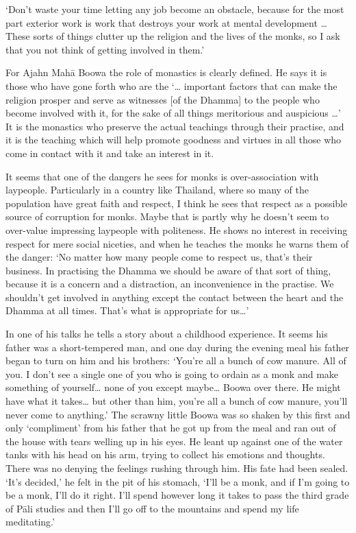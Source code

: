 `Don't waste your time letting any job become an obstacle, because for
the most part exterior work is work that destroys your work at mental
development \ldots{} These sorts of things clutter up the religion and
the lives of the monks, so I ask that you not think of getting involved
in them.'

For Ajahn Mahā Boowa the role of monastics is clearly defined. He says
it is those who have gone forth who are the `\ldots{} important factors
that can make the religion prosper and serve as witnesses [of the
Dhamma] to the people who become involved with it, for the sake of all
things meritorious and auspicious \ldots{}' It is the monastics who
preserve the actual teachings through their practise, and it is the
teaching which will help promote goodness and virtues in all those who
come in contact with it and take an interest in it. 

It seems that one of the dangers he sees for monks is over-association
with laypeople. Particularly in a country like Thailand, where so many
of the population have great faith and respect, I think he sees that
respect as a possible source of corruption for monks. Maybe that is
partly why he doesn't seem to over-value impressing laypeople with
politeness. He shows no interest in receiving respect for mere social
niceties, and when he teaches the monks he warns them of the danger: `No
matter how many people come to respect us, that's their business. In
practising the Dhamma we should be aware of that sort of thing, because
it is a concern and a distraction, an inconvenience in the practise. We
shouldn't get involved in anything except the contact between the heart
and the Dhamma at all times. That's what is appropriate for us\ldots{}'

In one of his talks he tells a story about a childhood experience. It
seems his father was a short-tempered man, and one day during the
evening meal his father began to turn on him and his brothers: `You're
all a bunch of cow manure. All of you. I don't see a single one of you
who is going to ordain as a monk and make something of yourself\ldots{}
none of you except maybe\ldots{} Boowa over there. He might have what
it takes\ldots{} but other than him, you're all a bunch of cow manure, 
you'll never come to anything.' The scrawny little Boowa was so shaken
by this first and only `compliment' from his father that he got up from
the meal and ran out of the house with tears welling up in his eyes. He
leant up against one of the water tanks with his head on his arm, trying
to collect his emotions and thoughts. There was no denying the feelings
rushing through him. His fate had been sealed. `It's decided,' he felt
in the pit of his stomach, `I'll be a monk, and if I'm going to be a
monk, I'll do it right. I'll spend however long it takes to pass the
third grade of Pāli studies and then I'll go off to the mountains and
spend my life meditating.'

